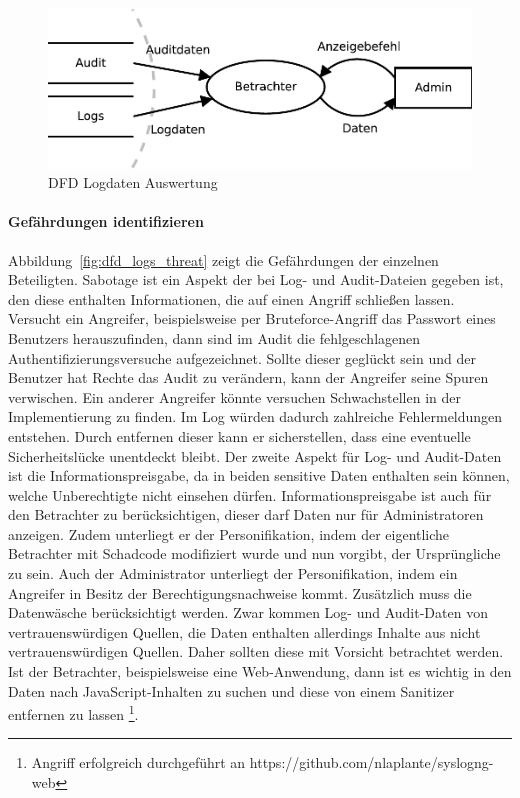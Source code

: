\documentclass[11pt,a4paper]{report}
\begin{document}
\begin{figure}[htbp]
\centering
\includegraphics[scale=0.7]{images/dfd_logs.pdf}
\caption{DFD Logdaten Auswertung}
\label{fig:dfd_logs}
\end{figure}

\paragraph{Gefährdungen identifizieren}
Abbildung~\ref{fig:dfd_logs_threat} zeigt die Gefährdungen der einzelnen Beteiligten. Sabotage ist ein Aspekt der bei Log- und Audit-Dateien gegeben ist, den diese enthalten Informationen, die auf einen Angriff schließen lassen. Versucht ein Angreifer, beispielsweise per Bruteforce-Angriff das Passwort eines Benutzers herauszufinden, dann sind im Audit die fehlgeschlagenen Authentifizierungsversuche aufgezeichnet. Sollte dieser geglückt sein und der Benutzer hat Rechte das Audit zu verändern, kann der Angreifer seine Spuren verwischen. Ein anderer Angreifer könnte versuchen Schwachstellen in der Implementierung zu finden. Im Log würden dadurch zahlreiche Fehlermeldungen entstehen. Durch entfernen dieser kann er sicherstellen, dass eine eventuelle Sicherheitslücke unentdeckt bleibt. Der zweite Aspekt für Log- und Audit-Daten ist die Informationspreisgabe, da in beiden sensitive Daten enthalten sein können, welche Unberechtigte nicht einsehen dürfen. Informationspreisgabe ist auch für den Betrachter zu berücksichtigen, dieser darf Daten nur für Administratoren anzeigen. Zudem unterliegt er der Personifikation, indem der eigentliche Betrachter mit Schadcode modifiziert wurde und nun vorgibt, der Ursprüngliche zu sein. Auch der Administrator unterliegt der Personifikation, indem ein Angreifer in Besitz der Berechtigungsnachweise kommt. Zusätzlich muss die Datenwäsche berücksichtigt werden. Zwar kommen Log- und Audit-Daten von vertrauenswürdigen Quellen, die Daten enthalten allerdings Inhalte aus nicht vertrauenswürdigen Quellen. Daher sollten diese mit Vorsicht betrachtet werden. Ist der Betrachter, beispielsweise eine Web-Anwendung, dann ist es wichtig in den Daten nach JavaScript-Inhalten zu suchen und diese von einem Sanitizer entfernen zu lassen \footnote{Angriff erfolgreich durchgeführt an https://github.com/nlaplante/syslogng-web}.
\end{document}
